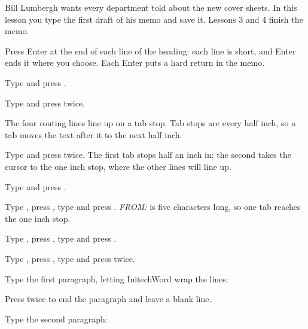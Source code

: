 Bill Lumbergh wants every department told about the new cover sheets.  In
this lesson you type the first draft of his memo and save it.  Lessons 3
and 4 finish the memo.

Press Enter at the end of each line of the heading: each line is short, and
Enter ends it where you choose.  Each Enter puts a hard return in the memo.
\begin{WPSteps}
\item Type  and press .
\item Type  and press  twice.
\end{WPSteps}

The four routing lines line up on a tab stop.  Tab stops are every half
inch, so a tab moves the text after it to the next half inch.
\begin{WPSteps}
\item Type  and press  twice.  The first tab
stops half an inch in; the second takes the cursor to the one inch stop,
where the other lines will line up.
\item Type  and press .
\item Type , press , type 
and press .  \textit{FROM:} is five characters long, so one
tab reaches the one inch stop.
\item Type , press , type 
and press .
\item Type , press , type
 and press  twice.
\end{WPSteps}

\begin{WPSteps}
\item Type the first paragraph, letting InitechWord wrap the lines:
\item Press  twice to end the paragraph and leave a blank
line.
\item Type the second paragraph:
\end{WPSteps}


